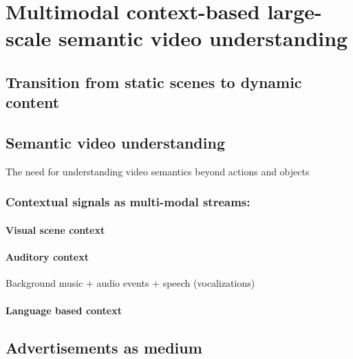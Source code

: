 \chapter{Multimodal context-based large-scale semantic video understanding}
\section{Transition from static scenes to dynamic content}
\section{Semantic video understanding}
The need for understanding video semantics beyond actions and objects 

\subsection{Contextual signals as multi-modal streams:}
    \subsubsection{Visual scene context}
    \subsubsection{Auditory context}
    Background music + audio events + speech (vocalizations)
    \subsubsection{Language based context}
\section{Advertisements as medium}
